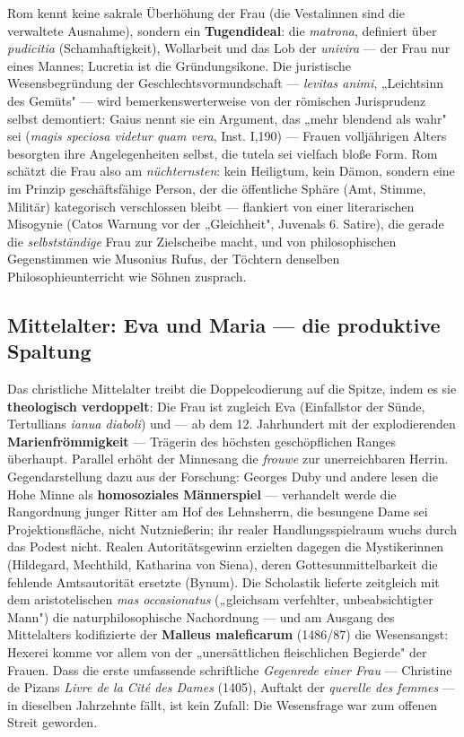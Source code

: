 \documentclass[11pt,a4paper,ngerman]{scrartcl}
\newcommand{\chipbase}[2]{\hspace{0pt}{\footnotesize\textcolor{#1}{[\textsc{#2}]}}}
\newcommand{\chipbelegt}[1]{\chipbase{chipgreen}{#1}}
\newcommand{\chipumstritten}[1]{\chipbase{chipred}{#1}}
\begin{document}
Rom kennt keine sakrale Überhöhung der Frau (die Vestalinnen sind die verwaltete Ausnahme), sondern ein \textbf{Tugendideal}: die \emph{matrona}, definiert über \emph{pudicitia} (Schamhaftigkeit), Wollarbeit und das Lob der \emph{univira} — der Frau nur eines Mannes; Lucretia ist die Gründungsikone. Die juristische Wesensbegründung der Geschlechtsvormundschaft — \emph{levitas animi}, „Leichtsinn des Gemüts" — wird bemerkenswerterweise von der römischen Jurisprudenz selbst demontiert: Gaius nennt sie ein Argument, das „mehr blendend als wahr" sei (\emph{magis speciosa videtur quam vera}, Inst. I,190) — Frauen volljährigen Alters besorgten ihre Angelegenheiten selbst, die tutela sei vielfach bloße Form. \chipbelegt{belegt} Rom schätzt die Frau also am \emph{nüchternsten}: kein Heiligtum, kein Dämon, sondern eine im Prinzip geschäftsfähige Person, der die öffentliche Sphäre (Amt, Stimme, Militär) kategorisch verschlossen bleibt — flankiert von einer literarischen Misogynie (Catos Warnung vor der „Gleichheit", Juvenals 6. Satire), die gerade die \emph{selbstständige} Frau zur Zielscheibe macht, und von philosophischen Gegenstimmen wie Musonius Rufus, der Töchtern denselben Philosophieunterricht wie Söhnen zusprach. \chipbelegt{belegt}

\subsection*{Mittelalter: Eva und Maria — die produktive Spaltung}

Das christliche Mittelalter treibt die Doppelcodierung auf die Spitze, indem es sie \textbf{theologisch verdoppelt}: Die Frau ist zugleich Eva (Einfallstor der Sünde, Tertullians \emph{ianua diaboli}) und — ab dem 12. Jahrhundert mit der explodierenden \textbf{Marienfrömmigkeit} — Trägerin des höchsten geschöpflichen Ranges überhaupt. Parallel erhöht der Minnesang die \emph{frouwe} zur unerreichbaren Herrin. Gegendarstellung dazu aus der Forschung: Georges Duby und andere lesen die Hohe Minne als \textbf{homosoziales Männerspiel} — verhandelt werde die Rangordnung junger Ritter am Hof des Lehnsherrn, die besungene Dame sei Projektionsfläche, nicht Nutznießerin; ihr realer Handlungsspielraum wuchs durch das Podest nicht. \chipumstritten{umstritten} Realen Autoritätsgewinn erzielten dagegen die Mystikerinnen (Hildegard, Mechthild, Katharina von Siena), deren Gottesunmittelbarkeit die fehlende Amtsautorität ersetzte (Bynum). Die Scholastik lieferte zeitgleich mit dem aristotelischen \emph{mas occasionatus} („gleichsam verfehlter, unbeabsichtigter Mann") die naturphilosophische Nachordnung — und am Ausgang des Mittelalters kodifizierte der \textbf{Malleus maleficarum} (1486/87) die Wesensangst: Hexerei komme vor allem von der „unersättlichen fleischlichen Begierde" der Frauen. Dass die erste umfassende schriftliche \emph{Gegenrede einer Frau} — Christine de Pizans \emph{Livre de la Cité des Dames} (1405), Auftakt der \emph{querelle des femmes} — in dieselben Jahrzehnte fällt, ist kein Zufall: Die Wesensfrage war zum offenen Streit geworden. \chipbelegt{belegt}
\end{document}
